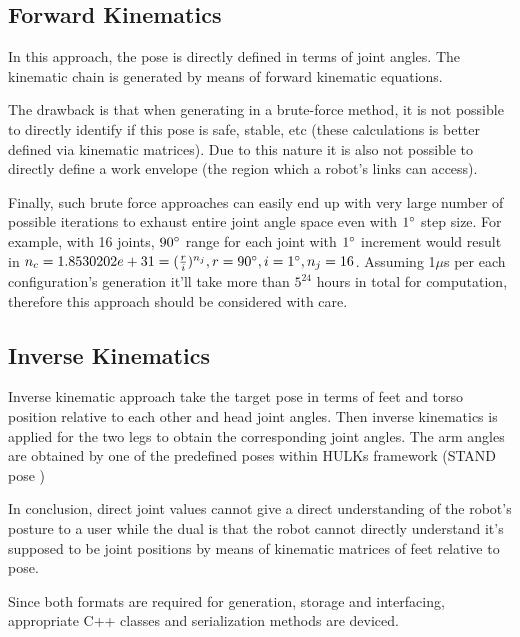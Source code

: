 \documentclass[english, printversion, nomenclature, notitle]{tuvisionthesis} %
\begin{document}
\subsection{Forward Kinematics}
\label{subsec:forward_kinematics_gen}

In this approach, the pose is directly defined in terms of joint angles. The kinematic chain is generated by means of forward kinematic equations.

The drawback is that when generating in a brute-force method, it is not possible to directly identify if this pose is safe, stable, etc (these calculations is better defined via kinematic matrices). Due to this nature it is also not possible to directly define a work envelope (the region which a robot's links can access).

Finally, such brute force approaches can easily end up with very large number of possible iterations to exhaust entire joint angle space even with $1\degree$ step size. For example, with 16 joints, $90\degree$ range for each joint with $1\degree$ increment would result in $ n_c = 1.8530202e+31 = (\frac{r}{i})^{n_j}, r = 90\degree, i = 1\degree, n_j = 16$. Assuming 1$\mu$s per each configuration's generation it'll take more than $5^{24}$ hours in total for computation, therefore this approach should be considered with care.

\subsection{Inverse Kinematics}
\label{subsec:inverse_kinematics_gen}

Inverse kinematic approach take the target pose in terms of feet and torso position relative to each other and head joint angles. Then inverse kinematics is applied for the two legs to obtain the corresponding joint angles. The arm angles are obtained by one of the predefined poses within HULKs framework (STAND pose )

In conclusion, direct joint values cannot give a direct understanding of the robot's posture to a user while the dual is that the robot cannot directly understand it's supposed to be joint positions by means of kinematic matrices of feet relative to pose. 

Since both formats are required for generation, storage and interfacing, appropriate C++ classes and serialization methods are deviced.

\end{document}
